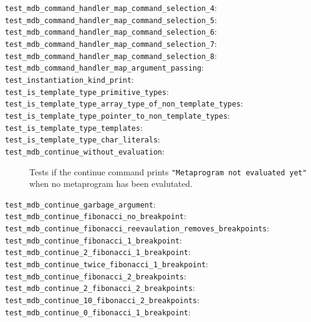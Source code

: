 \begin{description}
    \item[\texttt{test\_mdb\_command\_handler\_map\_command\_selection\_4}:]
    \item[\texttt{test\_mdb\_command\_handler\_map\_command\_selection\_5}:]
    \item[\texttt{test\_mdb\_command\_handler\_map\_command\_selection\_6}:]
    \item[\texttt{test\_mdb\_command\_handler\_map\_command\_selection\_7}:]
    \item[\texttt{test\_mdb\_command\_handler\_map\_command\_selection\_8}:]
    \item[\texttt{test\_mdb\_command\_handler\_map\_argument\_passing}:]
    \item[\texttt{test\_instantiation\_kind\_print}:]
    \item[\texttt{test\_is\_template\_type\_primitive\_types}:]
    \item[\texttt{test\_is\_template\_type\_array\_type\_of\_non\_template\_types}:]
    \item[\texttt{test\_is\_template\_type\_pointer\_to\_non\_template\_types}:]
    \item[\texttt{test\_is\_template\_type\_templates}:]
    \item[\texttt{test\_is\_template\_type\_char\_literals}:]
    \item[\texttt{test\_mdb\_continue\_without\_evaluation}:]
        Tests if the continue command prints
        \texttt{"Metaprogram not evaluated yet"} when no metaprogram has been
        evalutated.
    \item[\texttt{test\_mdb\_continue\_garbage\_argument}:]
    \item[\texttt{test\_mdb\_continue\_fibonacci\_no\_breakpoint}:]
    \item[\texttt{test\_mdb\_continue\_fibonacci\_reevaulation\_removes\_breakpoints}:]
    \item[\texttt{test\_mdb\_continue\_fibonacci\_1\_breakpoint}:]
    \item[\texttt{test\_mdb\_continue\_2\_fibonacci\_1\_breakpoint}:]
    \item[\texttt{test\_mdb\_continue\_twice\_fibonacci\_1\_breakpoint}:]
    \item[\texttt{test\_mdb\_continue\_fibonacci\_2\_breakpoints}:]
    \item[\texttt{test\_mdb\_continue\_2\_fibonacci\_2\_breakpoints}:]
    \item[\texttt{test\_mdb\_continue\_10\_fibonacci\_2\_breakpoints}:]
    \item[\texttt{test\_mdb\_continue\_0\_fibonacci\_1\_breakpoint}:]

\end{description}
